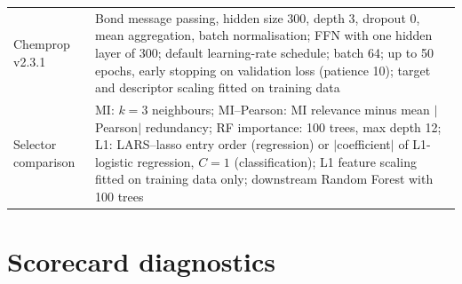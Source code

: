 \documentclass[10pt,a4paper]{article}
\begin{document}
\begin{table}[H]
\begin{tabular}{@{}>{\raggedright\arraybackslash}p{}>{\raggedright\arraybackslash}p{}@{}}
Chemprop v2.3.1 & Bond message passing, hidden size 300, depth 3, dropout 0, mean aggregation, batch normalisation; FFN with one hidden layer of 300; default learning-rate schedule; batch 64; up to 50 epochs, early stopping on validation loss (patience 10); target and descriptor scaling fitted on training data \\
Selector comparison & MI: $k=3$ neighbours; MI--Pearson: MI relevance minus mean $|$Pearson$|$ redundancy; RF importance: 100 trees, max depth 12; L1: LARS--lasso entry order (regression) or $|$coefficient$|$ of L1-logistic regression, $C=1$ (classification); L1 feature scaling fitted on training data only; downstream Random Forest with 100 trees \\
\bottomrule
\end{tabular}
\end{table}

\section*{Scorecard diagnostics}
\end{document}
